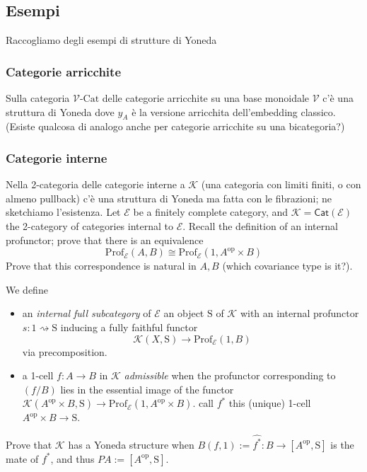 \documentclass[11pt]{article}
\def\Cat{\mathsf{Cat}}
\def\opp{\mathrm{op}}
\theoremstyle{reference}
\begin{document}
\subsection{Esempi}
\label{sec:orgbb0cebf}

Raccogliamo degli esempi di strutture di Yoneda

\subsubsection{Categorie arricchite}
\label{sec:org60c4d9b}

Sulla categoria \(\mathcal V\text{-Cat}\) delle categorie
  arricchite su una base monoidale \(\mathcal V\) c'è una
  struttura di Yoneda dove \(y_A\) è la versione arricchita
  dell'embedding classico. (Esiste qualcosa di analogo anche
  per categorie arricchite su una bicategoria?)

\subsubsection{Categorie interne}
\label{sec:org92413a0}

Nella 2-categoria delle categorie interne a \(\mathcal K\)
  (una categoria con limiti finiti, o con almeno pullback)
  c'è una struttura di Yoneda ma fatta con le fibrazioni; ne
  sketchiamo l'esistenza. Let \(\mathcal E\) be a finitely
  complete category, and \(\mathcal K = \Cat(\mathcal E)\) the
  2-category of categories internal to \(\mathcal E\). Recall
  the definition of an internal profunctor; prove that there
  is an equivalence $$ \mathrm{Prof}_{\mathcal E}(A,B) \cong
  \mathrm{Prof}_{\mathcal E}(1,A^\opp\times B)$$ Prove that
  this correspondence is natural in \(A,B\) (which covariance
  type is it?).

We define

\begin{itemize}
\item an \emph{internal full subcategory} of \(\mathcal E\) an
object \(\mathrm{S}\) of \(\mathcal K\) with an internal
profunctor \(s : 1 \rightsquigarrow \mathrm{S}\) inducing a
fully faithful functor \[\mathcal K(X,\mathrm{S}) \to
\mathrm{Prof}_{\mathcal E}(1,B)\] via precomposition. \item
a 1-cell \(f : A\to B\) in \(\mathcal K\) \emph{admissible} when
the profunctor corresponding to \((f/B)\) lies in the
essential image of the functor \(\mathcal K(A^\opp\times
B,\mathrm{S}) \to \mathrm{Prof}_{\mathcal E}(1,A^\opp\times
B)\). call \(f^*\) this (unique) 1-cell \(A^\opp\times B \to
\mathrm{S}\). \end{itemize} Prove that \(\mathcal K\) has a
Yoneda structure when \(B(f,1) := \widehat{f^*} : B \to
[A^\opp,\mathrm{S}]\) is the mate of \(f^*\), and thus \(P A :=
[A^\opp,\mathrm{S}]\).
\end{document}
